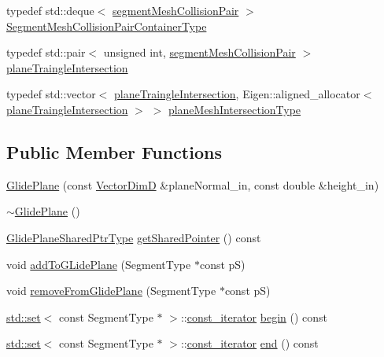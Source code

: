\begin{DoxyCompactItemize}
\item 
typedef std\+::deque$<$ \hyperlink{classmodel_1_1_glide_plane_ad28fb04f6f870da35e376e3ffa602fbd}{segment\+Mesh\+Collision\+Pair} $>$ \hyperlink{classmodel_1_1_glide_plane_a1fba1acd8a8051c426bc1f35f8c5ea94}{Segment\+Mesh\+Collision\+Pair\+Container\+Type}
\item 
typedef std\+::pair$<$ unsigned int, \hyperlink{classmodel_1_1_glide_plane_ad28fb04f6f870da35e376e3ffa602fbd}{segment\+Mesh\+Collision\+Pair} $>$ \hyperlink{classmodel_1_1_glide_plane_a808d78d8adf1c1a9443d9002889ca08e}{plane\+Traingle\+Intersection}
\item 
typedef std\+::vector$<$ \hyperlink{classmodel_1_1_glide_plane_a808d78d8adf1c1a9443d9002889ca08e}{plane\+Traingle\+Intersection}, Eigen\+::aligned\+\_\+allocator$<$ \hyperlink{classmodel_1_1_glide_plane_a808d78d8adf1c1a9443d9002889ca08e}{plane\+Traingle\+Intersection} $>$ $>$ \hyperlink{classmodel_1_1_glide_plane_a9e2fb6484e7b28887071b61f99d290bd}{plane\+Mesh\+Intersection\+Type}
\end{DoxyCompactItemize}
\subsection*{Public Member Functions}
\begin{DoxyCompactItemize}
\item 
\hyperlink{classmodel_1_1_glide_plane_a2ace8edae793ebb7dd4e7e2cdd746664}{Glide\+Plane} (const \hyperlink{classmodel_1_1_glide_plane_a2bb10efbec7067be952e933cdeb21ce7}{Vector\+Dim\+D} \&plane\+Normal\+\_\+in, const double \&height\+\_\+in)
\item 
\hyperlink{classmodel_1_1_glide_plane_acf8e8431dec56b4dc8e88cfd94beee1c}{$\sim$\+Glide\+Plane} ()
\item 
\hyperlink{classmodel_1_1_glide_plane_a3f02a68389497ce7dbcc0c3733ba6a01}{Glide\+Plane\+Shared\+Ptr\+Type} \hyperlink{classmodel_1_1_glide_plane_a00191b3baf1fb2ee2442267ef518e6e1}{get\+Shared\+Pointer} () const 
\item 
void \hyperlink{classmodel_1_1_glide_plane_aa15466e5854ce67a16dad1e50fa47c59}{add\+To\+G\+Lide\+Plane} (Segment\+Type $\ast$const p\+S)
\item 
void \hyperlink{classmodel_1_1_glide_plane_afb76e8c5bb9e10b7c9225a3ede0ae8b6}{remove\+From\+Glide\+Plane} (Segment\+Type $\ast$const p\+S)
\item 
\hyperlink{plot_cells_8m_a03623d69001c34fc77654be29bdc3d8a}{std\+::set}$<$ const Segment\+Type $\ast$ $>$\+::\hyperlink{structmodel_1_1_glide_plane_observer_afcc36252a3e72359768cef30011a9af6}{const\+\_\+iterator} \hyperlink{classmodel_1_1_glide_plane_a0b7444c675394c88bdefa850cc2f6c13}{begin} () const 
\item 
\hyperlink{plot_cells_8m_a03623d69001c34fc77654be29bdc3d8a}{std\+::set}$<$ const Segment\+Type $\ast$ $>$\+::\hyperlink{structmodel_1_1_glide_plane_observer_afcc36252a3e72359768cef30011a9af6}{const\+\_\+iterator} \hyperlink{classmodel_1_1_glide_plane_acc0e00e51b2dc516cc3cdb834e308009}{end} () const 
\end{DoxyCompactItemize}
